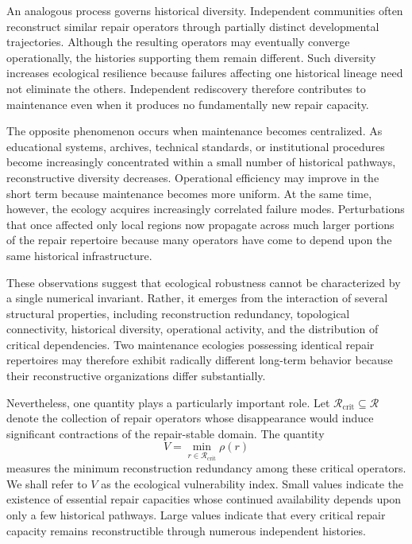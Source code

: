 \documentclass[12pt,oneside]{article}
\theoremstyle{plain}
\theoremstyle{definition}
\theoremstyle{remark}
\theoremstyle{plain}
\begin{document}
An analogous process governs historical diversity. Independent communities often reconstruct
similar repair operators through partially distinct developmental trajectories. Although the
resulting operators may eventually converge operationally, the histories supporting them remain
different. Such diversity increases ecological resilience because failures affecting one historical
lineage need not eliminate the others. Independent rediscovery therefore contributes to maintenance
even when it produces no fundamentally new repair capacity.

The opposite phenomenon occurs when maintenance becomes centralized. As educational systems,
archives, technical standards, or institutional procedures become increasingly concentrated within
a small number of historical pathways, reconstructive diversity decreases. Operational efficiency
may improve in the short term because maintenance becomes more uniform. At the same time, however,
the ecology acquires increasingly correlated failure modes. Perturbations that once affected only
local regions now propagate across much larger portions of the repair repertoire because many
operators have come to depend upon the same historical infrastructure.

These observations suggest that ecological robustness cannot be characterized by a single numerical
invariant. Rather, it emerges from the interaction of several structural properties, including
reconstruction redundancy, topological connectivity, historical diversity, operational activity, and
the distribution of critical dependencies. Two maintenance ecologies possessing identical repair
repertoires may therefore exhibit radically different long-term behavior because their
reconstructive organizations differ substantially.

Nevertheless, one quantity plays a particularly important role. Let $\mathcal{R}_{\mathrm{crit}}
\subseteq \mathcal{R}$ denote the collection of repair operators whose disappearance would induce
significant contractions of the repair-stable domain. The quantity
\[
V
=
\min_{r \in \mathcal{R}_{\mathrm{crit}}}
\rho(r)
\]
measures the minimum reconstruction redundancy among these critical operators. We shall refer to
$V$ as the ecological vulnerability index. Small values indicate the existence of essential repair
capacities whose continued availability depends upon only a few historical pathways. Large values
indicate that every critical repair capacity remains reconstructible through numerous independent
histories.
\end{document}
